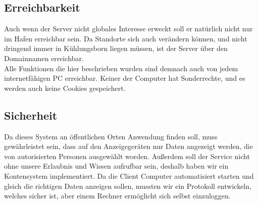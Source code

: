 \subsection{Erreichbarkeit} %
Auch wenn der Server nicht globales Interesse erweckt soll er natürlich nicht nur im Hafen erreichbar sein.
Da Standorte sich auch verändern können,
und nicht dringend immer in Kühlungsborn liegen müssen, ist der Server über den Domainnamen  erreichbar. \\
Alle Funktionen die hier beschrieben wurden sind demnach auch von jedem internetfähigen PC erreichbar. Keiner der Computer hat Sonderrechte,
und es werden auch keine Cookies gespeichert.

\subsection{Sicherheit} %
Da dieses System an öffentlichen Orten Anwendung finden soll,
muss gewährleistet sein, dass auf den Anzeigegeräten nur Daten angezeigt werden,
die von autorisierten Personen ausgewählt worden.
Außerdem soll der Service nicht ohne unsere Erlaubnis und Wissen aufrufbar sein,
deshalb haben wir ein Kontensystem implementiert.
Da die Client Computer automatisiert starten und gleich die richtigen Daten anzeigen sollen,
mussten wir ein Protokoll entwickeln, welches sicher ist,
aber einem Rechner ermöglicht sich selbst einzuloggen.
